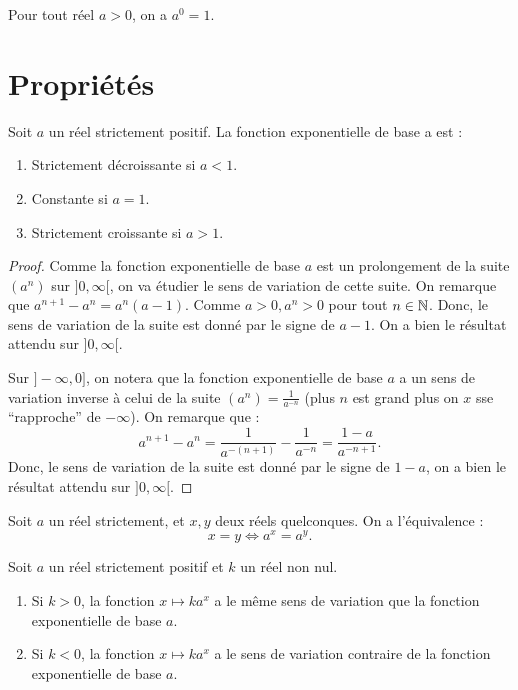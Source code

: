 \documentclass[a4paper, 12pt]{report}
\begin{document}
\begin{rmq}
Pour tout réel $a>0$, on a $a^0=1$.
\end{rmq}

\section{Propriétés}

\begin{prop}
Soit $a$ un réel strictement positif. La fonction exponentielle de base a est :
\begin{enumerate}[(1)]
\item
Strictement décroissante si $a < 1$.
\item
Constante si $a = 1$.
\item
Strictement croissante si $a > 1$.
\end{enumerate}
\end{prop}

\begin{proof}
Comme la fonction exponentielle de base $a$ est un prolongement de la suite $(a^n)$ sur $]0,\infty[$, 
on va étudier le sens de variation de cette suite.
On remarque que $a^{n+1}-a^n = a^n(a-1)$. Comme $a>0, a^n > 0$ pour tout $n \in \mathbb{N}$.
Donc, le sens de variation de la suite est donné par le signe de $a-1$. 
On a bien le résultat attendu sur $]0,\infty[$. \newline

Sur $]-\infty, 0]$, on notera que la fonction exponentielle de base $a$ 
a un sens de variation inverse à celui de la suite $(a^n) = \frac{1}{a^{-n}}$ (plus $n$ est grand plus on $x$ sse ``rapproche'' de $-\infty$).
On remarque que :
\[ a^{n+1}-a^n = \dfrac1{a^{-(n+1)}} - \dfrac1{a^{-n}} = \dfrac{1-a}{a^{-n+1}} . \]
Donc, le sens de variation de la suite est donné par le signe de $1-a$, on a bien le résultat attendu sur $]0,\infty[$.
\end{proof}

\begin{coro}
Soit $a$ un réel strictement, et $x,y$ deux réels quelconques. On a l'équivalence :
\[ x = y \iff a^x = a^y . \]
\end{coro}

\begin{coro}
Soit $a$ un réel strictement positif et $k$ un réel non nul.
\begin{enumerate}[(1)]
\item
Si $k>0$, la fonction $x \mapsto k a^x$ a le même sens de variation que la fonction exponentielle de base $a$.
\item
Si $k<0$, la fonction $x \mapsto k a^x$ a le sens de variation contraire de la fonction exponentielle de base $a$.
\end{enumerate}
\end{coro}
\end{document}
